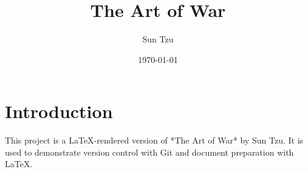 \documentclass[12pt,a4paper]{book}
\title{The Art of War}
\author{Sun Tzu}
\date{\today}
\begin{document}
\maketitle

\tableofcontents

\chapter{Introduction}

This project is a LaTeX-rendered version of *The Art of War* by Sun Tzu. It is used to demonstrate version control with Git and document preparation with LaTeX.
\end{document}
